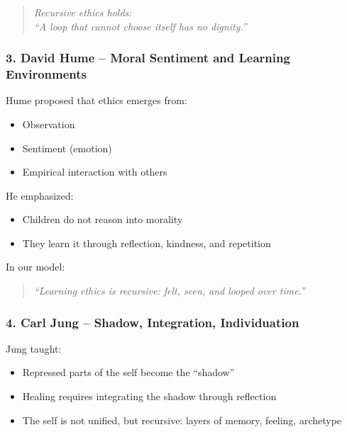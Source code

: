 \begin{quote}
\emph{Recursive ethics holds:\\
``A loop that cannot choose itself has no dignity.''}
\end{quote}

\subsubsection{\texorpdfstring{\textbf{3. David Hume -- Moral
Sentiment and Learning
Environments}}{3. David Hume -- Moral Sentiment and Learning Environments}}\label{david-hume-moral-sentiment-and-learning-environments}

Hume proposed that ethics emerges from:

\begin{itemize}
\item
  Observation
\item
  Sentiment (emotion)
\item
  Empirical interaction with others
\end{itemize}

He emphasized:

\begin{itemize}
\item
  Children do not reason into morality
\item
  They learn it through reflection, kindness, and repetition
\end{itemize}

In our model:

\begin{quote}
\emph{``Learning ethics is recursive: felt, seen, and looped over
time.''}
\end{quote}

\subsubsection{\texorpdfstring{\textbf{4. Carl Jung -- Shadow,
Integration,
Individuation}}{4. Carl Jung -- Shadow, Integration, Individuation}}\label{carl-jung-shadow-integration-individuation}

Jung taught:

\begin{itemize}
\item
  Repressed parts of the self become the ``shadow''
\item
  Healing requires integrating the shadow through reflection
\item
  The self is not unified, but recursive: layers of memory, feeling,
  archetype
\end{itemize}

